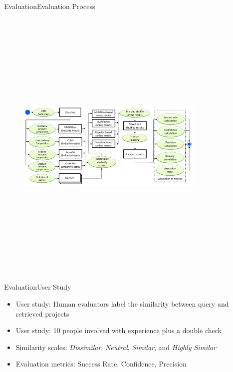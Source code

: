 \documentclass{beamer}
\begin{document}
\begin{frame}{Evaluation}{Evaluation Process}
	\begin{figure}[!h]
	\includegraphics[width=9cm,height=13.5cm,keepaspectratio]{images/EvaluationProcess.pdf}
	\centering
	\label{fig:EvalProcess}
	\end{figure}
\end{frame}

\begin{frame}{Evaluation}{User Study}
	\begin{itemize}
	\item User study: Human evaluators label the similarity between query and retrieved projects
	\item User study: 10 people involved with experience plus a double check
	\item Similarity scales: \emph{Dissimilar}, \emph{Neutral}, \emph{Similar}, and \emph{Highly Similar}
	\item Evaluation metrics: Success Rate, Confidence, Precision
	\end{itemize}
\end{frame}
\end{document}
